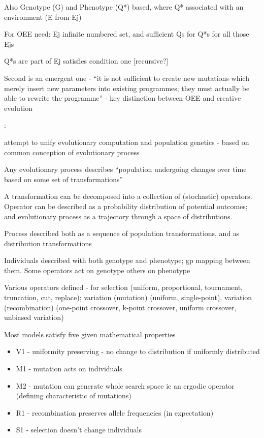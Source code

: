Also Genotype (G) and Phenotype (Q*) based, where Q* associated with
an environment (E from Ej)

For OEE need: Ej infinite numbered set, and sufficient Qs for Q*s
for all those Ejs

Q*s are part of Ej satisfies condition one {[}recursive?{]}

Second is an emergent one - ``it is not sufficient to create new
mutations which merely insert new parameters into existing
programmes; they must actually be able to rewrite the programme''
- key distinction between OEE and creative evolution

\autocite{Paixao2015}:

	attempt to unify evolutionary computation and population genetics -
	based on common conception of evolutionary process


	Any evolutionary process describes ``population undergoing changes
	over time based on some set of transformations''

	A transformation can be decomposed into a collection of (stochastic)
	operators. Operator can be described as a probability distribution of
	potential outcomes; and evolutionary process as a trajectory through a
	space of distributions.
	
	Process described both as a sequence of population transformations,
	and as distribution transformations

	
	Individuals described with both genotype and phenotype; gp mapping
	between them. Some operators act on genotype others on phenotype

	
	Various operators defined - for selection (uniform, proportional,
	tournament, truncation, cut, replace); variation (mutation) (uniform,
	single-point), variation (recombination) (one-point crossover, k-point
	crossover, uniform crossover, unbiased variation)

	Most models satisfy five given mathematical properties
		
	\begin{itemize}
		\item
		
		V1 - uniformity preserving - no change to distribution if uniformly
		distributed
		
		\item
		
		M1 - mutation acts on individuals
		
		\item
		
		M2 - mutation can generate whole search space ie an ergodic operator
		(defining characteristic of mutations)
		
		\item
		
		R1 - recombination preserves allele frequencies (in expectation)
		
		\item
		
		S1 - selection doesn't change individuals
		
	\end{itemize}

